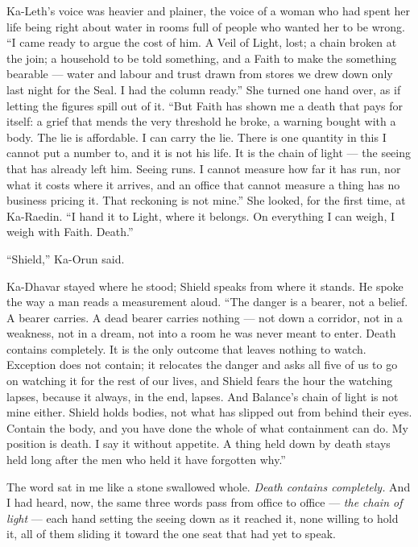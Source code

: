 Ka-Leth's voice was heavier and plainer, the voice of a woman who had spent her life being right about water in rooms full of people who wanted her to be wrong. ``I came ready to argue the cost of him. A Veil of Light, lost; a chain broken at the join; a household to be told something, and a Faith to make the something bearable --- water and labour and trust drawn from stores we drew down only last night for the Seal. I had the column ready.'' She turned one hand over, as if letting the figures spill out of it. ``But Faith has shown me a death that pays for itself: a grief that mends the very threshold he broke, a warning bought with a body. The lie is affordable. I can carry the lie. There is one quantity in this I cannot put a number to, and it is not his life. It is the chain of light --- the seeing that has already left him. Seeing runs. I cannot measure how far it has run, nor what it costs where it arrives, and an office that cannot measure a thing has no business pricing it. That reckoning is not mine.'' She looked, for the first time, at Ka-Raedin. ``I hand it to Light, where it belongs. On everything I can weigh, I weigh with Faith. Death.''\par

``Shield,'' Ka-Orun said.\par

Ka-Dhavar stayed where he stood; Shield speaks from where it stands. He spoke the way a man reads a measurement aloud. ``The danger is a bearer, not a belief. A bearer carries. A dead bearer carries nothing --- not down a corridor, not in a weakness, not in a dream, not into a room he was never meant to enter. Death contains completely. It is the only outcome that leaves nothing to watch. Exception does not contain; it relocates the danger and asks all five of us to go on watching it for the rest of our lives, and Shield fears the hour the watching lapses, because it always, in the end, lapses. And Balance's chain of light is not mine either. Shield holds bodies, not what has slipped out from behind their eyes. Contain the body, and you have done the whole of what containment can do. My position is death. I say it without appetite. A thing held down by death stays held long after the men who held it have forgotten why.''\par

The word sat in me like a stone swallowed whole. \emph{Death contains completely.} And I had heard, now, the same three words pass from office to office --- \emph{the chain of light} --- each hand setting the seeing down as it reached it, none willing to hold it, all of them sliding it toward the one seat that had yet to speak.\par

